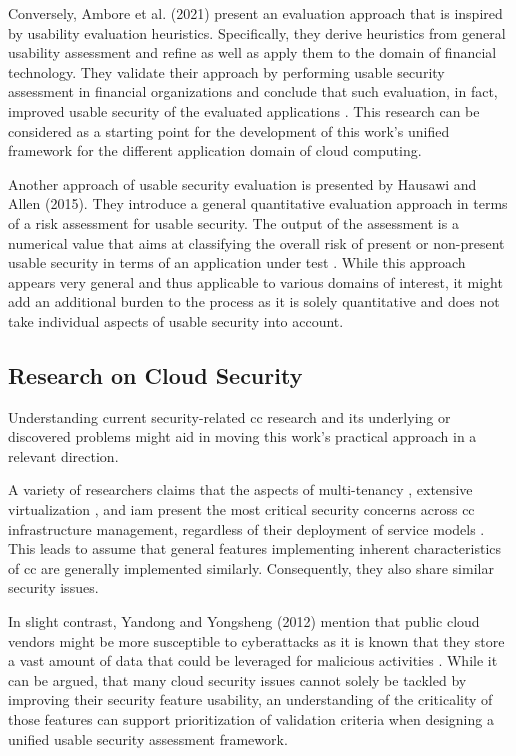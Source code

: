 Conversely, Ambore et al. (2021) present an evaluation approach that is inspired by usability evaluation heuristics. Specifically, they derive heuristics from general usability assessment and refine as well as apply them to the domain of financial technology. They validate their approach by performing usable security assessment in financial organizations and conclude that such evaluation, in fact, improved usable security of the evaluated applications \cite{ambore_development_2021}. This research can be considered as a starting point for the development of this work's unified framework for the different application domain of cloud computing.

Another approach of usable security evaluation is presented by Hausawi and Allen (2015). They introduce a general quantitative evaluation approach in terms of a risk assessment for usable security. The output of the assessment is a numerical value that aims at classifying the overall risk of present or non-present usable security in terms of an application under test \cite{tryfonas_usable-security_2015}. While this approach appears very general and thus applicable to various domains of interest, it might add an additional burden to the process as it is solely quantitative and does not take individual aspects of usable security into account.

\subsection{Research on Cloud Security}
Understanding current security-related \ac{cc} research and its underlying or discovered problems might aid in moving this work's practical approach in a relevant direction.

A variety of researchers claims that the aspects of multi-tenancy \cite{hashizume_analysis_2013, singh_cloud_2017,paxton_cloud_2016,manakattu_security_2020}, extensive virtualization \cite{felsch_how_2015,hashizume_analysis_2013}, and \ac{iam} \cite{almulla_cloud_2010} present the most critical security concerns across \ac{cc} infrastructure management, regardless of their deployment of service models \cite{manakattu_security_2020}. This leads to assume that general features implementing inherent characteristics of \ac{cc} are generally implemented similarly. Consequently, they also share similar security issues.

In slight contrast, Yandong and Yongsheng (2012) mention that public cloud vendors might be more susceptible to cyberattacks as it is known that they store a vast amount of data that could be leveraged for malicious activities \cite{yandong_cloud_2012}. While it can be argued, that many cloud security issues cannot solely be tackled by improving their security feature usability, an understanding of the criticality of those features can support prioritization of validation criteria when designing a unified usable security assessment framework. 

